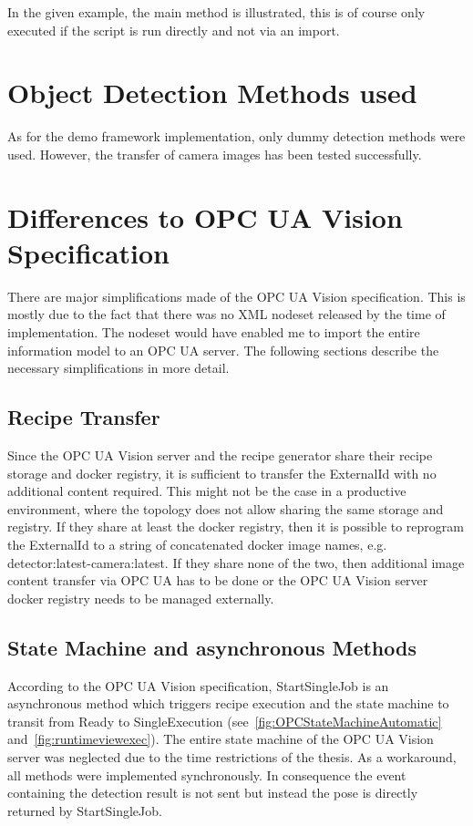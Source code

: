 In the given example, the main method is illustrated, this is of course only executed if the script is run directly and not via an import.

\section{Object Detection Methods used}
As for the demo framework implementation, only dummy detection methods were used. However, the transfer of camera images has been tested successfully.

\section{Differences to OPC UA Vision Specification}
There are major simplifications made of the OPC UA Vision specification. This is mostly due to the fact that there was no XML nodeset released by the time of implementation. The nodeset would have enabled me to import the entire information model to an OPC UA server. The following sections describe the necessary simplifications in more detail.

\subsection{Recipe Transfer}
Since the OPC UA Vision server and the recipe generator share their recipe storage and docker registry, it is sufficient to transfer the ExternalId with no additional content required. This might not be the case in a productive environment, where the topology does not allow sharing the same storage and registry. If they share at least the docker registry, then it is possible to reprogram the ExternalId to a string of concatenated docker image names, e.g. detector:latest-camera:latest. If they share none of the two, then additional image content transfer via OPC UA has to be done or the OPC UA Vision server docker registry needs to be managed externally.

\subsection{State Machine and asynchronous Methods}
According to the OPC UA Vision specification, StartSingleJob is an asynchronous method which triggers recipe execution and the state machine to transit from Ready to SingleExecution (see~\ref{fig:OPCStateMachineAutomatic} and~\ref{fig:runtimeviewexec}). The entire state machine of the OPC UA Vision server was neglected due to the time restrictions of the thesis. As a workaround, all methods were implemented synchronously. In consequence the event containing the detection result is not sent but instead the pose is directly returned by StartSingleJob.


